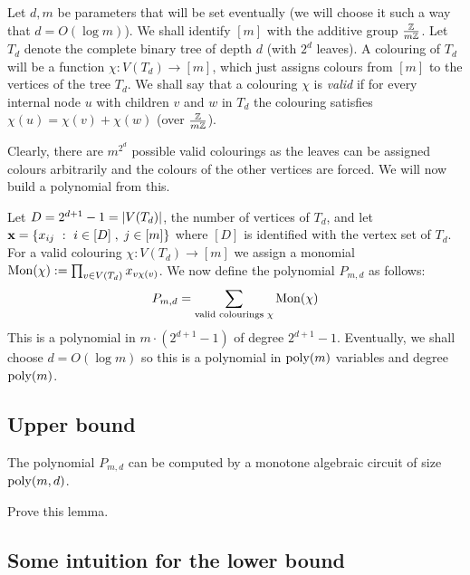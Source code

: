 Let $d,m$ be parameters that will be set eventually (we will choose it such a way that $d = O(\log m)$).
We shall identify $[m]$ with the additive group $\frac{\mathbb{Z}}{m\mathbb{Z}}$. Let $T_d$ denote the complete binary tree of depth $d$ (with $2^d$ leaves). A colouring of $T_d$ will be a function $\chi:V(T_d) \rightarrow [m]$, which just assigns colours from $[m]$ to the vertices of the tree $T_d$. We shall say that a colouring $\chi$ is \emph{valid} if for every internal node $u$ with children $v$ and $w$ in $T_d$ the colouring satisfies $\chi(u) = \chi(v) + \chi(w)$ (over $\frac{\mathbb{Z}}{m\mathbb{Z}}$).

Clearly, there are $m^{2^d}$ possible valid colourings as the leaves can be assigned colours arbitrarily and the colours of the other vertices are forced. We will now build a polynomial from this.

Let $D = 2^{d+1}-1= \left|V(T_d)\right|$, the number of vertices of $T_d$, and let $\mathbf{x} = \left\{{x_{ij}}\ : \ {i\in [D]\;,\;j\in [m]}\right\}$ where $[D]$ is identified with the vertex set of $T_d$.
For a valid colouring $\chi:V(T_d)\rightarrow [m]$ we  assign a monomial $\operatorname{Mon}(\chi) := \prod_{v\in V(T_d)} x_{v\chi(v)}$. We now define the polynomial $P_{m,d}$ as follows:
\[
  P_{m,d} = \sum_{\text{valid colourings } \chi} \operatorname{Mon}(\chi)
\]
This is a polynomial in $m \cdot (2^{d+1} - 1)$ of degree $2^{d+1}-1$. Eventually, we shall choose $d = O(\log m)$ so this is a polynomial in $\operatorname{poly}(m)$ variables and degree $\operatorname{poly}(m)$.

\subsection*{Upper bound}

\begin{lemma}\label{lem:MonSep-upper-bound}
  The polynomial $P_{m,d}$ can be computed by a monotone algebraic circuit of size $\operatorname{poly}(m,d)$.
\end{lemma}

\begin{exercise}
  Prove this lemma.
\end{exercise}

\subsection{Some intuition for the lower bound}

